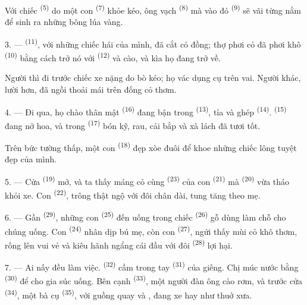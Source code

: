 Với chiếc  \textsuperscript{(5)} do một con 
\textsuperscript{(7)} khỏe kéo, ông vạch  \textsuperscript{(8)} mà vào
đó  \textsuperscript{(9)} sẽ vãi từng nắm  để
sinh ra những bông lúa vàng.

3. ---  \textsuperscript{(11)}, với những chiếc hái của mình, đã cắt
cỏ đồng; thợ phơi cỏ đã phơi khô  \textsuperscript{(10)} bằng cách trở nó
với  \textsuperscript{(12)} và cào, và kìa họ đang trở về.

Người thì đi trước chiếc xe nặng do bò kéo; họ vác dụng cụ trên vai. Người khác, lười
hơn, đã ngồi thoải mái trên đống cỏ thơm.

4. --- Đi qua, họ chào thân mật  \textsuperscript{(16)} đang bận
trong  \textsuperscript{(13)}, tỉa  và ghép
 \textsuperscript{(14)}.  \textsuperscript{(15)} đang nở
hoa, và trong  \textsuperscript{(17)} bón kỹ, rau, cải bắp và xà lách
đã tươi tốt.

Trên bức tường thấp, một con  \textsuperscript{(18)} đẹp xòe đuôi để khoe
những chiếc lông tuyệt đẹp của mình.

\VUsaut{3.0mm}

5. --- Cửa  \textsuperscript{(19)} mở, và ta thấy máng cỏ cùng
 \textsuperscript{(23)} của con  \textsuperscript{(21)}
mà  \textsuperscript{(20)} vừa tháo khỏi xe. Con  \textsuperscript{(22)}, trông thật ngộ với đôi chân dài, tung tăng theo mẹ.

6. --- Gần  \textsuperscript{(29)}, những con 
\textsuperscript{(25)} đến uống trong chiếc  \textsuperscript{(26)} gỗ dùng
làm chỗ cho chúng uống. Con  \textsuperscript{(24)} nhân dịp bú mẹ, còn con
 \textsuperscript{(27)}, ngửi thấy mùi cỏ khô thơm, rống lên vui vẻ và
kiêu hãnh ngẩng cái đầu với đôi  \textsuperscript{(28)} lợi hại.

7. --- Ai nấy đều làm việc.  \textsuperscript{(32)} cầm trong tay
 \textsuperscript{(31)} của giếng. Chị múc nước bằng 
\textsuperscript{(30)} để cho gia súc uống. Bên cạnh 
\textsuperscript{(33)}, một người đàn ông cào rơm, và trước cửa 
\textsuperscript{(34)}, một bà cụ  \textsuperscript{(35)}, với guồng
quay và , đang xe  hay  như thuở xưa.

